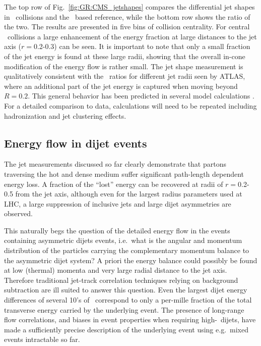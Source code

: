 The top row of Fig.~\ref{fig:GR:CMS_jetshapes} compares the differential jet shapes in \PbPb\
collisions and the \pp\ based reference, while the bottom row shows the ratio of the two.
The results are presented in five bins of collision centrality.
For central \PbPb\ collisions a large enhancement of the energy fraction at large distances
to the jet axis ($r = $0.2-0.3) can be seen. It is important to note that only a small
fraction of the jet energy is found at these large radii, showing that the overall in-cone
modification of the energy flow is rather small.
The jet shape measurement is qualitatively consistent with the \Rcp\ ratios for different jet radii seen by ATLAS,
where an additional part of the jet energy is captured when moving beyond $R = 0.2$.
This general behavior has been predicted in several model calculations \cite{Vitev:2008rz,Renk:2009hv}.
For a detailed comparison to data, calculations will need to be repeated including hadronization and 
jet clustering effects.

\subsection{Energy flow in dijet events}

The jet measurements discussed so far clearly demonstrate that partons traversing the hot and dense
medium suffer significant path-length dependent energy loss. A fraction of the ``lost'' energy
can be recovered at radii of $r=$0.2-0.5 from the jet axis, although even for the largest radius
parameters used at LHC, a large suppression of inclusive jets and large dijet asymmetries are
observed.

This naturally begs the question of the detailed energy flow in the events containing asymmetric
dijets events, i.e.\ what is the angular and momentum distribution of the particles carrying
the complementary momentum balance to the asymmetric dijet system? A priori the energy balance
could possibly be found at low (thermal) momenta and very large radial distance to the jet axis.
Therefore traditional jet-track correlation techniques relying on background subtraction are ill suited
to answer this question. Even the largest dijet energy differences of several 10's of \GeV\
correspond to only a per-mille fraction of the total transverse energy carried by the underlying 
event. The presence of long-range flow correlations, and biases in event properties when requiring 
high-\pT\ dijets, have made a sufficiently precise description of the underlying event using e.g.\ 
mixed events intractable so far.

